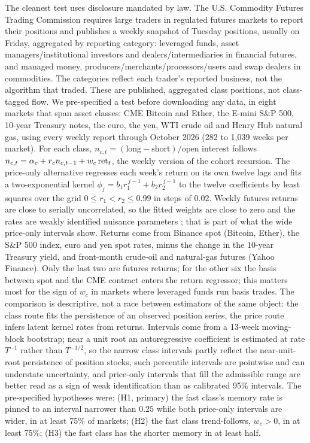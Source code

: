 \documentclass[12pt]{article}
\theoremstyle{definition}
\theoremstyle{remark}
\begin{document}
The cleanest test uses disclosure mandated by law. The U.S. Commodity Futures Trading Commission requires large traders in regulated futures markets to report their positions and publishes a weekly snapshot of Tuesday positions, usually on Friday, aggregated by reporting category: leveraged funds, asset managers/institutional investors and dealers/intermediaries in financial futures, and managed money, producers/merchants/processors/users and swap dealers in commodities. The categories reflect each trader's reported business, not the algorithm that traded. These are published, aggregated class positions, not class-tagged flow. We pre-specified a test before downloading any data, in eight markets that span asset classes: CME Bitcoin and Ether, the E-mini S\&P 500, 10-year Treasury notes, the euro, the yen, WTI crude oil and Henry Hub natural gas, using every weekly report through October 2026 (282 to 1{,}039 weeks per market). For each class, $n_{c,t}=(\text{long}-\text{short})/\text{open interest}$ follows $n_{c,t}=\alpha_c+r_cn_{c,t-1}+w_c\,{\rm ret}_t$, the weekly version of the cohort recursion. The price-only alternative regresses each week's return on its own twelve lags and fits a two-exponential kernel $\phi_j=b_1r_1^{\,j-1}+b_2r_2^{\,j-1}$ to the twelve coefficients by least squares over the grid $0\le r_1<r_2\le0.99$ in steps of $0.02$. Weekly futures returns are close to serially uncorrelated, so the fitted weights are close to zero and the rates are weakly identified nuisance parameters \citep{andrews2012}; that is part of what the wide price-only intervals show. Returns come from Binance spot (Bitcoin, Ether), the S\&P 500 index, euro and yen spot rates, minus the change in the 10-year Treasury yield, and front-month crude-oil and natural-gas futures (Yahoo Finance). Only the last two are futures returns; for the other six the basis between spot and the CME contract enters the return regressor; this matters most for the sign of $w_c$ in markets where leveraged funds run basis trades. The comparison is descriptive, not a race between estimators of the same object: the class route fits the persistence of an observed position series, the price route infers latent kernel rates from returns. Intervals come from a 13-week moving-block bootstrap; near a unit root an autoregressive coefficient is estimated at rate $T^{-1}$ rather than $T^{-1/2}$, so the narrow class intervals partly reflect the near-unit-root persistence of position stocks, such percentile intervals are pointwise and can understate uncertainty, and price-only intervals that fill the admissible range are better read as a sign of weak identification than as calibrated 95\% intervals. The pre-specified hypotheses were: (H1, primary) the fast class's memory rate is pinned to an interval narrower than $0.25$ while both price-only intervals are wider, in at least 75\% of markets; (H2) the fast class trend-follows, $w_c>0$, in at least 75\%; (H3) the fast class has the shorter memory in at least half.
\end{document}
